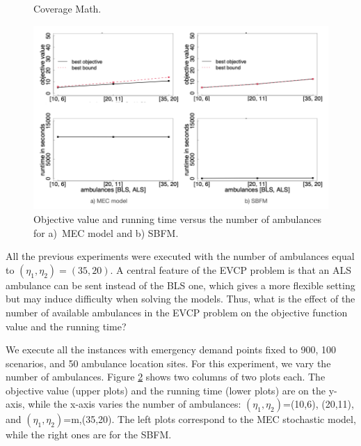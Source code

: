 \begin{figure}[H]
\hspace{0.4cm}%
\vspace{0.4cm}
\caption{Coverage Math.}
\label{Cov_Math}
\end{figure}




\begin{figure}[htb]
    \centering
    \includegraphics[width=0.9\linewidth]{AmbComp.png}
    \caption{Objective value and running time versus the number of ambulances for a)~MEC model and b) SBFM.}
    \label{fig:amb}
\end{figure}

 All the previous experiments were executed with the number of ambulances equal to $(\eta_1,\eta_2)=   (35,20) $. A central feature of the EVCP problem is that an ALS ambulance can be sent instead of the BLS one, which gives a more flexible setting but may induce difficulty when solving the models. 
 Thus, what is the effect of the number of available ambulances in the EVCP problem on the objective function value and the running time?

  
 We execute all the instances with emergency demand points fixed to 900, 100 scenarios, and 50 ambulance location sites. For this experiment, we vary the number of ambulances. Figure \ref{fig:amb} shows two columns of two plots each. The objective value (upper plots) and the running time (lower plots) are on the y-axis, while the x-axis varies the number of ambulances: $(\eta_1,\eta_2)$=(10,6), (20,11), and  $(\eta_1,\eta_2)$=m,(35,20). The left plots correspond to the MEC stochastic model, while the right ones are for the SBFM. 

